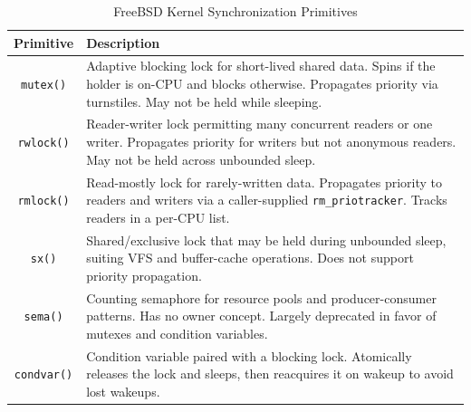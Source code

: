 \begin{table}[!htb]
	\centering
	\begin{tabular}{|c|p{}|}
		\hline
		\textbf{Primitive} & \textbf{Description}                                                                                                                                                        \\
		\hline\hline
		\texttt{mutex()}   & Adaptive blocking lock for short-lived shared data. Spins if the holder is on-CPU and blocks otherwise. Propagates priority via turnstiles. May not be held while sleeping. \\ \hline
		\texttt{rwlock()}  & Reader-writer lock permitting many concurrent readers or one writer. Propagates priority for writers but not anonymous readers. May not be held across unbounded sleep.     \\ \hline
		\texttt{rmlock()}  & Read-mostly lock for rarely-written data. Propagates priority to readers and writers via a caller-supplied \texttt{rm\_priotracker}. Tracks readers in a per-CPU list.      \\ \hline
		\texttt{sx()}      & Shared/exclusive lock that may be held during unbounded sleep, suiting VFS and buffer-cache operations. Does not support priority propagation.                              \\ \hline
		\texttt{sema()}    & Counting semaphore for resource pools and producer-consumer patterns. Has no owner concept. Largely deprecated in favor of mutexes and condition variables.                 \\ \hline
		\texttt{condvar()} & Condition variable paired with a blocking lock. Atomically releases the lock and sleeps, then reacquires it on wakeup to avoid lost wakeups.                                \\ \hline
	\end{tabular}
	\caption{FreeBSD Kernel Synchronization Primitives \parencites{freebsd_locking}{freebsd_rmlock}{freebsd_sema}}
	\label{freebsd-sync-primitives}
\end{table}

